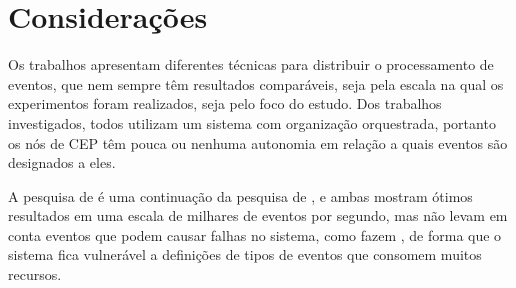 





\section{Considerações}


Os trabalhos apresentam diferentes técnicas para distribuir o processamento de eventos, que nem sempre têm resultados comparáveis, seja pela escala na qual os experimentos foram realizados, seja pelo foco do estudo. Dos trabalhos investigados, todos utilizam um sistema com organização orquestrada, portanto os nós de CEP têm pouca ou nenhuma autonomia em relação a quais eventos são designados a eles. 

A pesquisa de \cite{Kobayashi:2015:CEP:2675743.2776771} é uma continuação da pesquisa de \cite{Isoyama:2012:SCE:2335484.2335498}, e ambas mostram ótimos resultados em uma escala de milhares de eventos por segundo, mas não levam em conta eventos que podem causar falhas no sistema, como fazem \cite{6906776}, de forma que o sistema fica vulnerável a definições de tipos de eventos que consomem muitos recursos.

